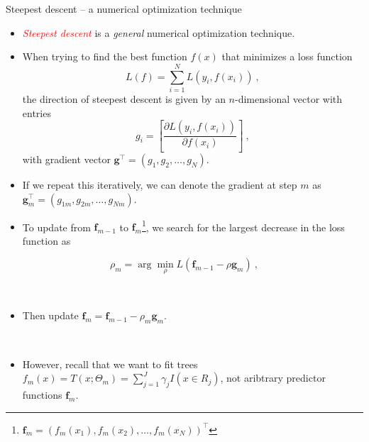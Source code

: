 \documentclass[
  10pt,
  ignorenonframetext,
]{beamer}
\providecommand{\tightlist}{%
  \setlength{\itemsep}{0pt}\setlength{\parskip}{0pt}}
\begin{document}
\begin{frame}
\begin{block}{Steepest descent -- a numerical optimization technique}
\protect\hypertarget{steepest-descent-a-numerical-optimization-technique}{}
\(~\)

\begin{itemize}
\tightlist
\item
  \emph{\textcolor{red}{Steepest descent}} is a \emph{general} numerical
  optimization technique.
\end{itemize}

\vspace{2mm}

\begin{itemize}
\tightlist
\item
  When trying to find the best function \(f(x)\) that minimizes a loss
  function \[L(f) = \sum_{i=1}^N L(y_i,f(x_i)) \ ,\] the direction of
  steepest descent is given by an \(n\)-dimensional vector with entries
  \[g_{i} = \left[ \frac{\partial L(y_i,f(x_i))}{\partial f(x_i)} \right] \ ,\]
  with gradient vector
  \(\mathbf{g}^\top = (g_{1},g_{2},\ldots, g_{N})\).
\end{itemize}
\end{block}
\end{frame}

\begin{frame}
\begin{itemize}
\tightlist
\item
  If we repeat this iteratively, we can denote the gradient at step
  \(m\) as \(\mathbf{g}_m^\top = (g_{1m},g_{2m},\ldots, g_{Nm})\).
\end{itemize}

\vspace{2mm}

\begin{itemize}
\tightlist
\item
  To update from \(\mathbf{f}_{m-1}\) to
  \(\mathbf{f}_m\)\footnote{$\mathbf{f}_m = (f_m(x_1),f_m(x_2),\ldots, f_m(x_N))^\top$ },
  we search for the largest decrease in the loss function as
\end{itemize}

\[\rho_m = \arg \min_\rho L(\mathbf{f}_{m-1} - \rho \mathbf{g}_m) \ , \]

\(~\)

\begin{itemize}
\tightlist
\item
  Then update \(\mathbf{f}_m = \mathbf{f}_{m-1} - \rho_m \mathbf{g}_m\).
\end{itemize}

\(~\)

\pause

\begin{itemize}
\tightlist
\item
  However, recall that we want to fit trees
  \(f_m(x)=T(x;\Theta_m)=\sum_{j=1}^J \gamma_j I(x\in R_j)\), not
  aribtrary predictor functions \(\mathbf{f}_m\).
\end{itemize}
\end{frame}
\end{document}
